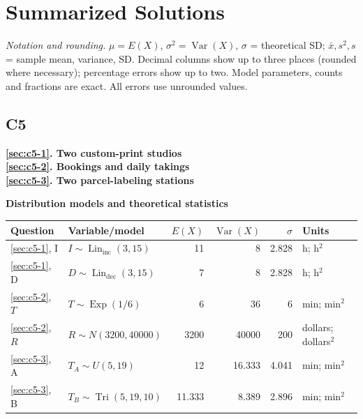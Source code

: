{\newpage
\section{Summarized Solutions}
\begingroup
\small
\linespread{1.08}\selectfont
\setlength{\parskip}{5pt}
\setlength{\tabcolsep}{5pt}
\renewcommand{\arraystretch}{1.2}
\textit{Notation and rounding.} $\mu=E(X)$, $\sigma^2=\operatorname{Var}(X)$,
$\sigma$ = theoretical SD; $\bar{x},s^2,s$ = sample mean, variance, SD.
Decimal columns show up to three places (rounded where necessary); percentage errors
show up to two. Model parameters, counts and fractions are exact. All errors use
unrounded values.

\begin{minipage}{\linewidth}
\subsection*{C5}
\textbf{\ref{sec:c5-1}. Two custom-print studios}\\
\textbf{\ref{sec:c5-2}. Bookings and daily takings}\\
\textbf{\ref{sec:c5-3}. Two parcel-labeling stations}

\textbf{Distribution models and theoretical statistics}

\par\smallskip
\begin{tabularx}{\linewidth}{@{}l >{\raggedright\arraybackslash}X rrr l@{}}
\toprule
Question & Variable/model & $E(X)$ & $\operatorname{Var}(X)$ & $\sigma$ & Units \\
\midrule
\ref{sec:c5-1}, I & $I\sim\operatorname{Lin}_{\mathrm{inc}}(3,15)$ & 11\phantom{.000} & 8\phantom{.000} & 2.828 & h; h$^2$ \\
\ref{sec:c5-1}, D & $D\sim\operatorname{Lin}_{\mathrm{dec}}(3,15)$ & 7\phantom{.000} & 8\phantom{.000} & 2.828 & h; h$^2$ \\
\ref{sec:c5-2}, $T$ & $T\sim\operatorname{Exp}(1/6)$ & 6\phantom{.000} & 36\phantom{.000} & 6\phantom{.000} & min; min$^2$ \\
\ref{sec:c5-2}, $R$ & $R\sim N(3200,40000)$ & 3200\phantom{.000} & 40000\phantom{.000} & 200\phantom{.000} & dollars; dollars$^2$ \\
\ref{sec:c5-3}, A & $T_A\sim U(5,19)$ & 12\phantom{.000} & 16.333 & 4.041 & min; min$^2$ \\
\ref{sec:c5-3}, B & $T_B\sim\operatorname{Tri}(5,19,10)$ & 11.333 & 8.389 & 2.896 & min; min$^2$ \\
\bottomrule
\end{tabularx}
\par\smallskip


\end{minipage}}

